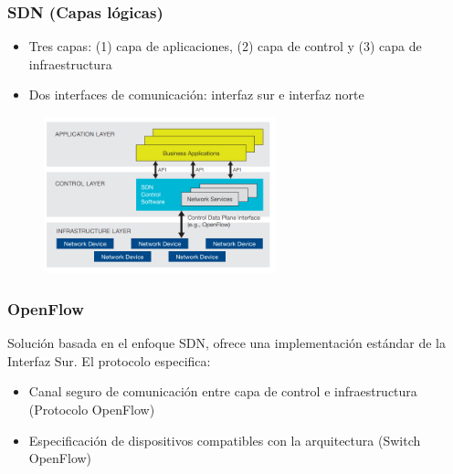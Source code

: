 \documentclass{beamer}
\begin{document}
\begin{frame}
\frametitle{SDN (Capas l\'ogicas)} 

\begin{itemize}
\item Tres capas: (1) capa de aplicaciones, (2) capa de control y (3) capa de infraestructura
\item Dos interfaces de comunicaci\'on: interfaz sur e interfaz norte
\end{itemize}
 

\begin{figure}[H]
\centering
\includegraphics[width=0.6\textwidth]{imagenes/SDNArchitecture.png}
\end{figure}
\end{frame}

\begin{frame}
\frametitle{OpenFlow} 

Soluci\'on basada en el enfoque SDN, ofrece una implementaci\'on est\'andar de la Interfaz Sur. El protocolo especifica:

\begin{itemize}
\item Canal seguro de comunicaci\'on entre capa de control e infraestructura (Protocolo OpenFlow)
\item Especificaci\'on de dispositivos compatibles con la arquitectura (Switch OpenFlow)
\end{itemize}


\end{frame}
\end{document}
